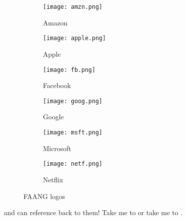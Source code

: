 \documentclass[]{modern-homework}
\begin{document}
\begin{figure}[h]
  \begin{subfigure}[t]{0.33\textwidth}
    \centering
    \texttt{[image: amzn.png]}
    \caption{Amazon}
    \label{fig:Amazon}
  \end{subfigure}
  \begin{subfigure}[t]{0.33\textwidth}
    \centering
    \texttt{[image: apple.png]}
    \caption{Apple}
    \label{fig:Apple}
  \end{subfigure}
  \begin{subfigure}[t]{0.33\textwidth}
    \centering
    \texttt{[image: fb.png]}
    \caption{Facebook}
    \label{fig:Facebook}
  \end{subfigure}
  \begin{subfigure}[t]{0.33\textwidth}
    \centering
    \texttt{[image: goog.png]}
    \caption{Google}
    \label{fig:Google}
  \end{subfigure}
  \begin{subfigure}[t]{0.33\textwidth}
    \centering
    \texttt{[image: msft.png]}
    \caption{Microsoft}
    \label{fig:Microsoft}
  \end{subfigure}
  \begin{subfigure}[t]{0.33\textwidth}
    \centering
    \texttt{[image: netf.png]}
    \caption{Netflix}
    \label{fig:Netflix}
  \end{subfigure}
  \caption{FAANG logos}
  \label{fig:FAANG}
\end{figure}

\vspace{7em}

and can reference back to them! Take me to  or take me to  .
\end{document}
